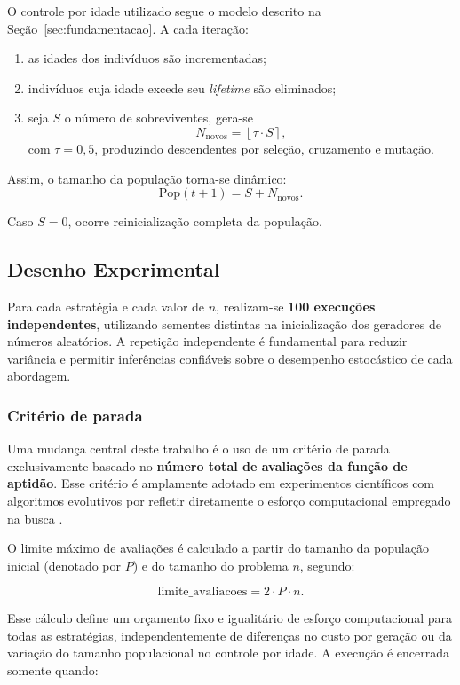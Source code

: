O controle por idade utilizado segue o modelo descrito na Seção~\ref{sec:fundamentacao}. A cada iteração:

\begin{enumerate}
    \item as idades dos indivíduos são incrementadas;
    \item indivíduos cuja idade excede seu \textit{lifetime} são eliminados;
    \item seja $S$ o número de sobreviventes, gera-se
    \[
        N_{\text{novos}} = \left\lfloor \tau \cdot S \right\rceil,
    \]
    com $\tau = 0{,}5$, produzindo descendentes por seleção, cruzamento e mutação.
\end{enumerate}

Assim, o tamanho da população torna-se dinâmico:
\[
    \text{Pop}(t+1) = S + N_{\text{novos}}.
\]

Caso $S=0$, ocorre reinicialização completa da população.

\subsection{Desenho Experimental}

Para cada estratégia e cada valor de $n$, realizam-se \textbf{100 execuções independentes}, utilizando sementes distintas na inicialização dos geradores de números aleatórios. A repetição independente é fundamental para reduzir variância e permitir inferências confiáveis sobre o desempenho estocástico de cada abordagem.

\subsubsection*{Critério de parada}

Uma mudança central deste trabalho é o uso de um critério de parada exclusivamente baseado no \textbf{número total de avaliações da função de aptidão}. Esse critério é amplamente adotado em experimentos científicos com algoritmos evolutivos por refletir diretamente o esforço computacional empregado na busca \cite{eiben2015introduction}.

O limite máximo de avaliações é calculado a partir do tamanho da população inicial (denotado por $P$) e do tamanho do problema $n$, segundo:

\[
\text{limite\_avaliacoes} = 2 \cdot P \cdot n.
\]

Esse cálculo define um orçamento fixo e igualitário de esforço computacional para todas as estratégias, independentemente de diferenças no custo por geração ou da variação do tamanho populacional no controle por idade. A execução é encerrada somente quando:

